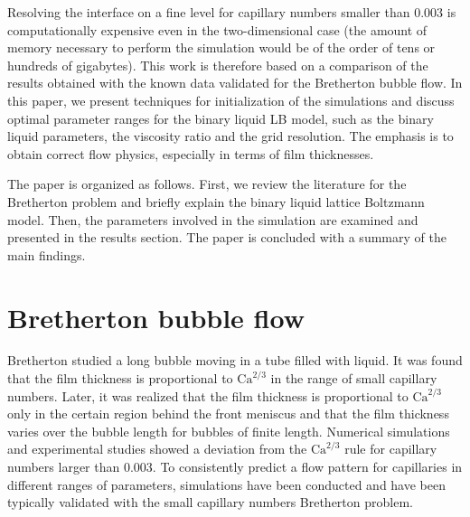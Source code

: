 \documentclass[preprint,12pt]{elsarticle}
\newcommand{\Ca}{\mathrm{Ca}}
\begin{document}
Resolving the interface on a fine level for capillary numbers smaller than
$0.003$ is computationally expensive even in the two-dimensional case
(the amount of memory necessary to perform the simulation would be of the order
of tens or hundreds of gigabytes).  This work is therefore based on a
comparison of the results obtained with the known data
validated for the Bretherton bubble flow.  In this paper, we present
techniques for initialization of the simulations and discuss optimal
parameter ranges for the binary liquid LB model, such as the binary liquid parameters, the viscosity
ratio and the grid resolution. The emphasis is to obtain correct flow physics, especially in terms
of film thicknesses.


The paper is organized as follows.  First, we review the literature
for the Bretherton problem and briefly
explain the binary liquid lattice Boltzmann model. Then, the parameters involved in the
simulation are examined and presented in the results section. The paper is
concluded with a summary of the main findings.

\section{Bretherton bubble flow}
Bretherton \cite{bretherton} studied a long bubble
moving in a tube filled with liquid. It was found that the film thickness
is proportional to $\Ca^{2/3}$ in the range of small capillary numbers. Later,
it was realized \cite{wong-films,wong-pressure} that the film thickness
is proportional to $\Ca^{2/3}$ only in the certain region behind the front meniscus and
that the film thickness
varies over the bubble length for bubbles of finite length. Numerical
simulations \cite{giavedoni-numerical} and experimental studies
\cite{kreutzer-pressure-drop} showed a deviation from the $\Ca^{2/3}$ rule for capillary numbers
larger than $0.003$.
To consistently  predict a flow pattern for capillaries in
different ranges of parameters, simulations have been conducted and have been typically validated with the
small capillary numbers Bretherton problem.
\end{document}
